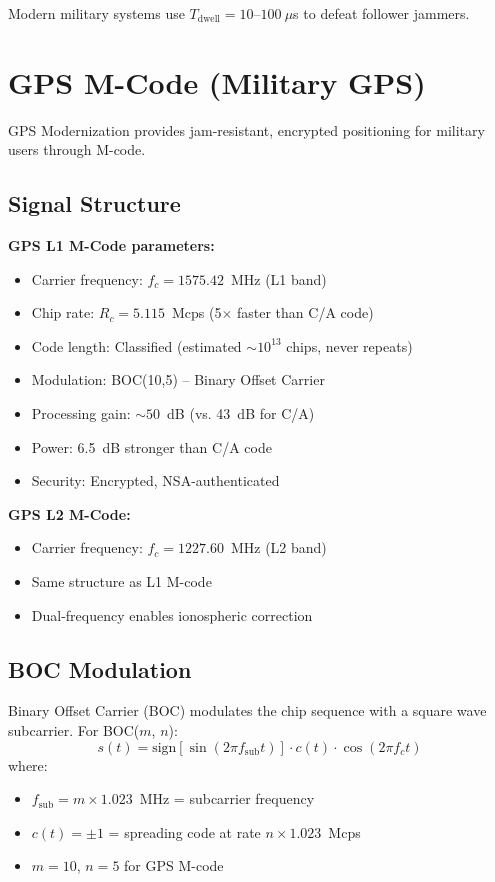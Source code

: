 Modern military systems use $T_{\text{dwell}} = 10$--$100~\mu$s to defeat follower jammers.

\section{GPS M-Code (Military GPS)}

GPS Modernization provides jam-resistant, encrypted positioning for military users through M-code.

\subsection{Signal Structure}

\textbf{GPS L1 M-Code parameters:}
\begin{itemize}
\item Carrier frequency: $f_c = 1575.42$~MHz (L1 band)
\item Chip rate: $R_c = 5.115$~Mcps (5$\times$ faster than C/A code)
\item Code length: Classified (estimated $\sim 10^{13}$ chips, never repeats)
\item Modulation: BOC(10,5) -- Binary Offset Carrier
\item Processing gain: $\sim 50$~dB (vs. 43~dB for C/A)
\item Power: 6.5~dB stronger than C/A code
\item Security: Encrypted, NSA-authenticated
\end{itemize}

\textbf{GPS L2 M-Code:}
\begin{itemize}
\item Carrier frequency: $f_c = 1227.60$~MHz (L2 band)
\item Same structure as L1 M-code
\item Dual-frequency enables ionospheric correction
\end{itemize}

\subsection{BOC Modulation}

Binary Offset Carrier (BOC) modulates the chip sequence with a square wave subcarrier. For BOC($m$, $n$):
\begin{equation}
s(t) = \text{sign}[\sin(2\pi f_{\text{sub}} t)] \cdot c(t) \cdot \cos(2\pi f_c t)
\end{equation}
where:
\begin{itemize}
\item $f_{\text{sub}} = m \times 1.023$~MHz = subcarrier frequency
\item $c(t) = \pm 1$ = spreading code at rate $n \times 1.023$~Mcps
\item $m = 10$, $n = 5$ for GPS M-code
\end{itemize}

